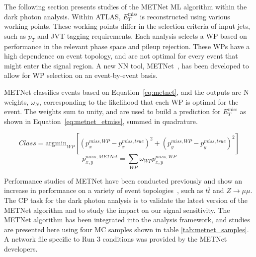 The following section presents studies of the METNet ML algorithm within the dark photon analysis.
Within ATLAS, \(E_T^{\text{miss}} \) is reconstructed using various working points.
These working points differ in the selection criteria of input jets, such as  $p_T$ and JVT tagging requirements.
Each analysis selects a WP based on performance in the relevant phase space and pileup rejection.
These WPs have a high dependence on event topology, and are not optimal for every event that might enter the signal region.
A new NN tool, METNet~\cite{hodkinson_2023}, has been developed to allow for WP selection on an event-by-event basis.

METNet classifies events based on Equation~\ref{eq:metnet}, and the outputs are N weights, \( \omega_N \), corresponding to the likelihood that each WP is optimal for the event.
The weights sum to unity, and are used to build a prediction for \(E_T^{\text{miss}} \) as shown in Equation~\ref{eq:metnet_etmiss}, summed in quadrature.

\begin{equation}
    Class = \text{argmin}_{WP} \left[ (p^{miss,WP}_{x} - p^{miss,true}_{x})^2 + (p^{miss,WP}_{y} - p^{miss,true}_{y})^2 \right]
    \label{eq:metnet}
\end{equation}
\begin{equation}
    p^{miss,METNet}_{x,y} = \sum_{WP} \omega_{WP} p^{miss,WP}_{x,y}
    \label{eq:metnet_etmiss}
\end{equation}

Performance studies of METNet have been conducted previously and show an increase in performance on a variety of event topologies~\cite{hodkinson_2023,Horstmann2025metnet}, such as $t\bar{t}$ and $Z\rightarrow\mu\mu$.
The CP task for the dark photon analysis is to validate the latest version of the METNet algorithm and to study the impact on our signal sensitivity.
The METNet algorithm has been integrated into the analysis framework, and studies are presented here using four MC samples shown in table \ref{tab:metnet_samples}.
A network file specific to Run 3 conditions was provided by the METNet developers.

